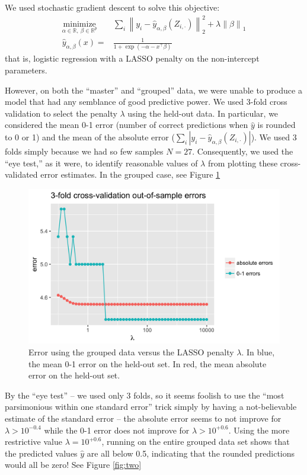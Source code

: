 \documentclass{article}
\newcommand{\op}[2]{{\ensuremath{\underset{ #2 }{\operatorname{ #1 }}~}}}
\newcommand{\norm}[1]{{ \ensuremath{ \left\lVert  #1 \right\rVert  }  }}
\newcommand{\R}{ \ensuremath{ \mathbb{R} }}
\begin{document}
We used stochastic gradient descent to solve this objective:
\begin{align*}
\op{minimize}{\alpha \in \R,~\beta \in \R^p}& \sum_i \norm{y_i - \hat{y}_{\alpha,\beta}(Z_{i,\cdot})}_2^2 + \lambda \norm{\beta}_1\\
\hat{y}_{\alpha, \beta}(x)=&\frac{1}{1+\exp\left(- \alpha - x^\top \beta \right)}
\end{align*}
that is, logistic regression with a LASSO penalty on the non-intercept parameters.

However, on both the ``master'' and ``grouped'' data, we were unable to produce a model that had any semblance
of good predictive power. We used 3-fold cross validation to select the penalty $\lambda$ using the held-out data.
In particular, we considered the mean 0-1 error (number of correct predictions when $\hat{y}$ is rounded to 0 or 1)
and the mean of the absolute error ($\sum_i \left|y_i - \hat{y}_{\alpha,\beta}(Z_{i,\cdot})\right|$). We used 3 folds
simply because we had so few samples $N=27$. Consequently, we used the ``eye test,'' as it were, to identify
reasonable values of $\lambda$ from plotting these cross-validated error estimates. In the grouped case, see Figure \ref{fig:one}

\begin{figure}[h]
\begin{center}
\includegraphics[scale=0.2]{3-fold-CV-kegg.png}
\caption{\label{fig:one}Error using the grouped data versus the LASSO penalty $\lambda$.
In blue, the mean 0-1 error on the held-out set. In red, the mean absolute error on the held-out set.}
\end{center}
\end{figure}

By the ``eye test'' -- we used only 3 folds, so it seems foolish to use the ``most parsimonious within one standard 
error'' trick simply by having a not-believable estimate of the standard error -- the absolute error seems to not 
improve for $\lambda > 10^{-0.4}$ while the 0-1 error does not improve for $\lambda > 10^{+0.6}$. Using the more
restrictive value $\lambda = 10^{+0.6}$, running on the entire grouped data set shows that the predicted values 
$\hat{y}$ are all below 0.5, indicating that the rounded predictions would all be zero! See Figure \ref{fig:two}
\end{document}
